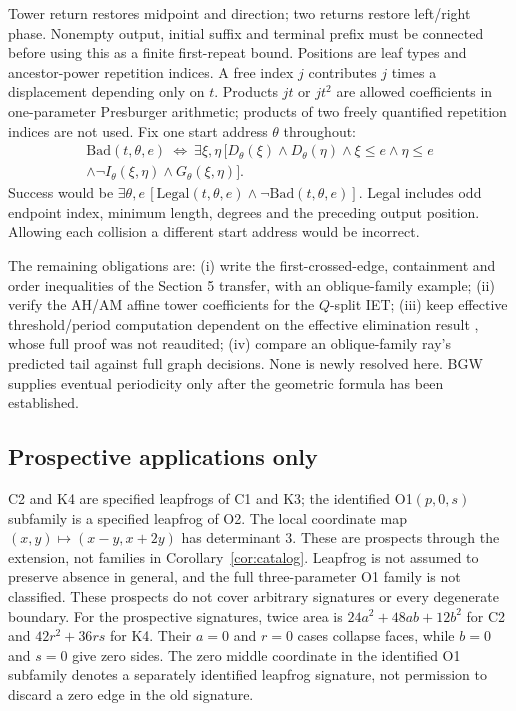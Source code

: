 \documentclass[11pt]{amsart}
\theoremstyle{definition}\newtheorem{definition}{Definition}
\begin{document}
Tower return restores midpoint and direction; two returns restore
left/right phase. Nonempty output, initial suffix and terminal prefix
must be connected before using this as a finite first-repeat bound.
Positions are leaf types and ancestor-power repetition indices.
A free index $j$ contributes $j$ times a displacement depending only
on $t$. Products $jt$ or $jt^2$ are allowed coefficients in one-parameter
Presburger arithmetic; products of two freely quantified repetition
indices are not used. Fix one start address $\theta$ throughout:
\[
\begin{split}
\mathrm{Bad}(t,\theta,e)\ \Longleftrightarrow\
\exists\xi,\eta\,[D_\theta(\xi)\wedge D_\theta(\eta)
\wedge\xi\le e\wedge\eta\le e\\
\wedge\neg I_\theta(\xi,\eta)\wedge G_\theta(\xi,\eta)].
\end{split}
\]
Success would be $\exists\theta,e\,[\mathrm{Legal}(t,\theta,e)
\wedge\neg\mathrm{Bad}(t,\theta,e)]$. Legal includes odd endpoint index,
minimum length, degrees and the preceding output position. Allowing
each collision a different start address would be incorrect.

The remaining obligations are: (i) write the first-crossed-edge,
containment and order inequalities of the Section 5 transfer, with an
oblique-family example; (ii) verify the AH/AM affine tower coefficients
for the $Q$-split IET; (iii) keep effective threshold/period computation
dependent on the effective elimination result \cite{QE}, whose full
proof was not reaudited; (iv) compare an oblique-family ray's predicted
tail against full graph decisions. None is newly resolved here.
BGW supplies eventual periodicity only after the geometric formula
has been established.

\subsection{Prospective applications only}
C2 and K4 are specified leapfrogs of C1 and K3; the identified O1$(p,0,s)$
subfamily is a specified leapfrog of O2. The local coordinate map
$(x,y)\mapsto(x-y,x+2y)$ has determinant 3. These are prospects through
the extension, not families in Corollary~\ref{cor:catalog}. Leapfrog
is not assumed to preserve absence in general, and the full
three-parameter O1 family is not classified. These prospects do not
cover arbitrary signatures or every degenerate boundary. For the prospective signatures, twice area is $24a^2+48ab+12b^2$ for C2 and $42r^2+36rs$ for K4. Their $a=0$ and $r=0$ cases collapse faces, while $b=0$ and $s=0$ give zero sides. The zero middle coordinate in the identified O1 subfamily denotes a separately identified leapfrog signature, not permission to discard a zero edge in the old signature.
\end{document}
